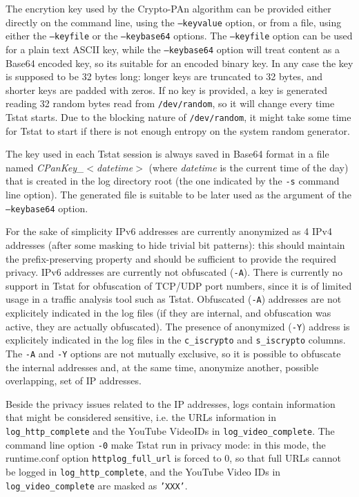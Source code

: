\documentclass[11pt]{article}
\begin{document}
The encrytion key used by the Crypto-PAn algorithm can be provided either directly on 
the command line, using the \texttt{--keyvalue} option, or from a file, using 
either the \texttt{--keyfile} or the \texttt{--keybase64} options. The \texttt{--keyfile} option
can be used for a plain text ASCII key, while the \texttt{--keybase64} option will treat 
content as a Base64 encoded key, so its suitable for an encoded binary key. In any case
the key is supposed to be 32 bytes long: longer keys are truncated to 32 bytes, and 
shorter keys are padded with zeros. If no key is provided, a key is generated reading 
32 random bytes read from \texttt{/dev/random}, so it will change every time Tstat starts.
Due to the blocking nature of \texttt{/dev/random}, it might take some time for Tstat to
start if there is not enough entropy on the system random generator.



The key used in each Tstat session is always saved in Base64 format in a file named 
\emph{CPanKey\_$<$datetime}$>$  (where \textit{datetime} is the current time of the day) that is 
created in the log directory root (the one indicated by the \texttt{-s} command line option).
The generated file is suitable to be later used as the argument of the \texttt{--keybase64} 
option.



For the sake of simplicity IPv6 addresses are currently anonymized as 4 IPv4 addresses 
(after some masking to hide trivial bit patterns): this should maintain the 
prefix-preserving property and should be sufficient to provide the required privacy.
IPv6 addresses are currently not obfuscated (\texttt{-A}).
There is currently no support in Tstat for obfuscation of TCP/UDP port numbers, 
since it is of limited usage in a traffic analysis tool such as Tstat.
Obfuscated (\texttt{-A}) addresses are not explicitely indicated in the log files (if they are
internal, and obfuscation was active, they are actually obfuscated). The presence of 
anonymized (\texttt{-Y}) address is explicitely indicated in the log files in the \texttt{c\_iscrypto}
and \texttt{s\_iscrypto} columns.
The \texttt{-A} and \texttt{-Y} options are not mutually exclusive, so it is possible to obfuscate the
internal addresses and, at the same time, anonymize another, possible overlapping, set of
IP addresses.



Beside the privacy issues related to the IP addresses, logs contain information that 
might be considered sensitive, i.e. the URLs information in \texttt{log\_http\_complete} and 
the YouTube VideoIDs in \texttt{log\_video\_complete}. The command line option \texttt{-0} make Tstat 
run in privacy mode: in this mode, the runtime.conf option \texttt{httplog\_full\_url} is forced 
to 0, so that full URLs cannot be logged in \texttt{log\_http\_complete}, and the YouTube 
Video IDs in \texttt{log\_video\_complete} are masked as \texttt{'XXX'}.
\end{document}
